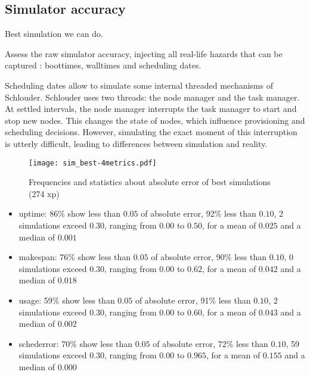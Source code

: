 \documentclass[a4paper,10pt]{article}
\newcommand\vrpath{../../lab/setup/simschlouder/validation-results/}
\begin{document}
\subsection{Simulator accuracy}

Best simulation we can do.

Assess the raw simulator accuracy, injecting all real-life hazards that can be 
captured :
boottimes, walltimes and scheduling dates.

Scheduling dates allow to simulate some internal threaded mechanisms of 
Schlouder.
Schlouder uses two threads: the node manager and the task manager.
At settled intervals, the node manager interrupts the task manager to start and 
stop new nodes.
This changes the state of nodes, which influence provisioning and scheduling 
decisions.
However, simulating the exact moment of this interruption is utterly difficult, 
leading to differences between simulation and reality.


\begin{figure}
  \centering

  \texttt{[image: sim\_best-4metrics.pdf]}
  
  
  
\caption{Frequencies and statistics about absolute error of best simulations (274 xp)}
\end{figure} 

 


\begin{itemize}
 \item uptime: 
      86\% show less than $0.05$ of absolute error, 
      92\% less than $0.10$, 
      2 simulations exceed $0.30$,
      ranging from $0.00$ to $0.50$, for a mean of $0.025$ and a median of $0.001$
 \item makespan: 
      76\% show less than $0.05$ of absolute error, 
      90\% less than $0.10$, 
      0 simulations exceed $0.30$,
      ranging from $0.00$ to $0.62$, for a mean of $0.042$ and a median of $0.018$
 \item usage: 
      59\% show less than $0.05$ of absolute error, 
      91\% less than $0.10$, 
      2 simulations exceed $0.30$,
      ranging from $0.00$ to $0.60$, for a mean of $0.043$ and a median of $0.002$
 \item schederror: 
      70\% show less than $0.05$ of absolute error, 
      72\% less than $0.10$, 
      59 simulations exceed $0.30$,
      ranging from $0.00$ to $0.965$, for a mean of $0.155$ and a median of $0.000$
\end{itemize}
\end{document}

